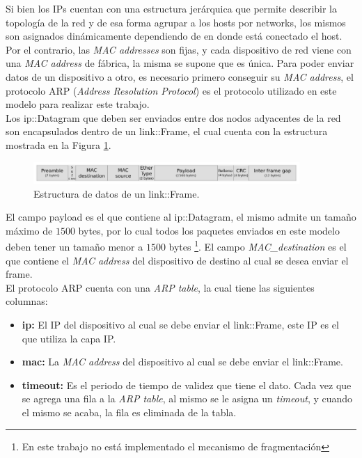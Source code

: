 \documentclass[10pt,a4paper]{article}
\begin{document}
Si bien los IPs cuentan con una estructura jerárquica que permite describir la topología de la red y de esa forma agrupar a los hosts por networks, los mismos son asignados dinámicamente dependiendo de en donde está conectado el host. Por el contrario, las \textit{MAC addresses} son fijas, y cada dispositivo de red viene con una \textit{MAC address} de fábrica, la misma se supone que es única. Para poder enviar datos de un dispositivo a otro, es necesario primero conseguir su \textit{MAC address}, el protocolo ARP (\textit{Address Resolution Protocol}) es el protocolo utilizado en este modelo para realizar este trabajo. \\

Los ip::Datagram que deben ser enviados entre dos nodos adyacentes de la red son encapsulados dentro de un link::Frame, el cual cuenta con la estructura mostrada en la Figura \ref{figure: frame structure}. \\

\begin{figure}[!htb]
    \centering
    \includegraphics[width = 0.9\textwidth]{img/png/l2-frame.png}
    \caption{Estructura de datos de un link::Frame.}
    \label{figure: frame structure}
\end{figure}

El campo payload es el que contiene al ip::Datagram, el mismo admite un tamaño máximo de $1500$ bytes, por lo cual todos los paquetes enviados en este modelo deben tener un tamaño menor a $1500$ bytes \footnote{En este trabajo no está implementado el mecanismo de fragmentación}. El campo \textit{MAC\_destination} es el que contiene el \textit{MAC address} del dispositivo de destino al cual se desea enviar el frame.\\

El protocolo ARP cuenta con una \textit{ARP table}, la cual tiene las siguientes columnas:

\begin{itemize}
\item \textbf{ip:} El IP del dispositivo al cual se debe enviar el link::Frame, este IP es el que utiliza la capa IP.
\item \textbf{mac:} La \textit{MAC address} del dispositivo al cual se debe enviar el link::Frame.
\item \textbf{timeout:} Es el periodo de tiempo de validez que tiene el dato. Cada vez que se agrega una fila a la \textit{ARP table}, al mismo se le asigna un \textit{timeout}, y cuando el mismo se acaba, la fila es eliminada de la tabla.
\end{itemize}
\end{document}
